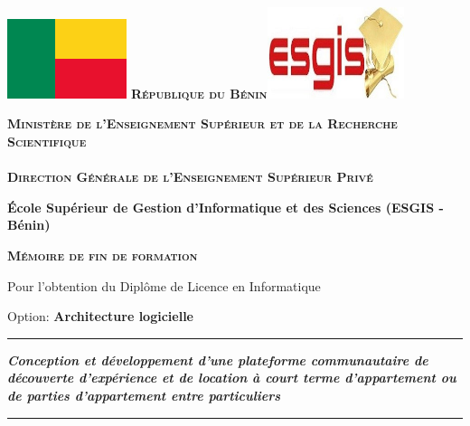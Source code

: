 \begin{titlepage}

\includegraphics[width=3.5cm]{images/benin.png}\qquad\qquad\qquad
\textsc{\textbf{République du Bénin}}\qquad\qquad\quad \includegraphics[width=4cm]{images/esgis.jpg}

\begin{center}
\textsc{\textbf{Ministère de l'Enseignement Supérieur et de la Recherche Scientifique}}
\\$ $\\ \textsc{\textbf{Direction Générale de l'Enseignement Supérieur Privé}}
\end{center}

\vspace*{1cm}

\begin{center}
\bf{\large{\'Ecole Supérieur de Gestion d’Informatique et des Sciences (ESGIS - Bénin)}}
\end{center}

\parindent=0pt
\small {} 

\hspace{4cm}


\begin{center}
\textsc{\large{\textbf{Mémoire de fin de formation}}} 
\end{center}

\begin{center} Pour l'obtention du Diplôme de Licence en Informatique\end{center}

\begin{center}Option: \bf{Architecture logicielle}
\end{center}

\vspace*{1cm}

\rule{17cm}{3pt}
\begin{center}\bfseries\Large
   \textit{Conception et développement d’une plateforme communautaire de découverte d’expérience et de location à court terme d’appartement ou de parties d’appartement entre particuliers} 
\end{center}
\rule{17cm}{3pt}


\end{titlepage}
